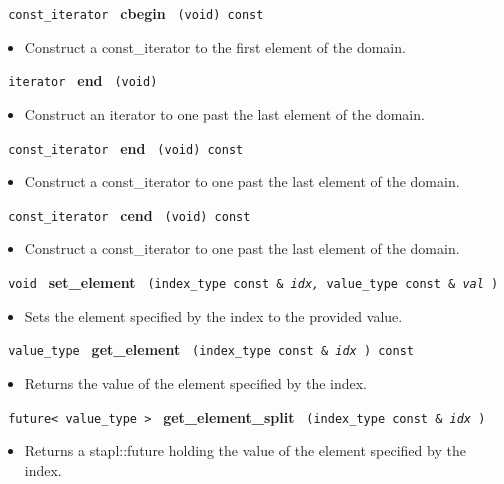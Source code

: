 \noindent
\texttt{%
const\_iterator
}
\textbf{cbegin}%
\texttt{%
(void) const
}

\begin{itemize}
\item
Construct a const\_iterator to the first element of the domain.
\end{itemize}
 
\noindent
\texttt{%
iterator
}
\textbf{end}%
\texttt{%
(void)
}

\begin{itemize}
\item
Construct an iterator to one past the last element of the domain.
\end{itemize}
 
\noindent
\texttt{%
const\_iterator
}
\textbf{end}%
\texttt{%
(void) const
}

\begin{itemize}
\item
Construct a const\_iterator to one past the last element of the domain.
\end{itemize}
 
\noindent
\texttt{%
const\_iterator
}
\textbf{cend}%
\texttt{%
(void) const
}

\begin{itemize}
\item
Construct a const\_iterator to one past the last element of the domain.
\end{itemize}
 
\noindent
\texttt{%
void
}
\textbf{set\_element}%
\texttt{%
(index\_type const \&
\textit{idx,}%
value\_type const \&
\textit{val}%
)
}

\begin{itemize}
\item
Sets the element specified by the index to the provided value.
\end{itemize}
 
\noindent
\texttt{%
value\_type
}
\textbf{get\_element}%
\texttt{%
(index\_type const \&
\textit{idx}%
) const
}

\begin{itemize}
\item
Returns the value of the element specified by the index.
\end{itemize}
 
\noindent
\texttt{%
future< value\_type >
}
\textbf{get\_element\_split}%
\texttt{%
(index\_type const \&
\textit{idx}%
)
}

\begin{itemize}
\item
Returns a stapl::future holding the value of the element specified by the index.
\end{itemize}
 
